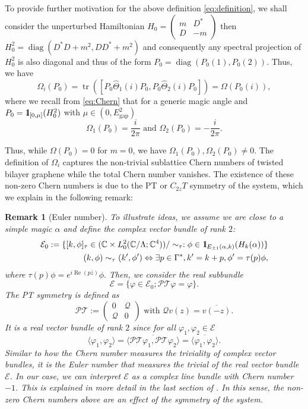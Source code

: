 \documentclass[reqno,12pt,letterpaper]{amsart}
\newcommand{\CC}{{\mathbb C}}
\newtheorem{rem}[theo]{Remark}
\numberwithin{equation}{section}
\DeclareMathOperator{\Real}{Re}
\let\Re=\Real
\DeclareMathOperator{\tr}{tr}
\def\indic{\operatorname{1\hskip-2.75pt\relax l}}
\begin{document}
\begin{appendix}
To provide further motivation for the above definition \eqref{eq:definition}, we shall consider the unperturbed Hamiltonian $H_{0} = \begin{pmatrix} m & D^* \\ D & -m \end{pmatrix}$ then $H_0^2 = \operatorname{diag}(D^*D+m^2 , DD^* + m^2 ) $ and consequently any spectral projection of $H_0^2$ is also diagonal and thus of the form $P_0 = \operatorname{diag}(P_0(1) , P_0(2)).$ Thus, we have 
\[ \Omega_i(P_0) = \tr( [P_0 \hat \Theta_1(i) P_0 , P_0 \hat \Theta_2(i) P_0]) = \Omega(P_0(i)),\]
where we recall from \eqref{eq:Chern} that for a generic magic angle and $P_0 = \indic_{[0,\mu]}(H_0^2)$ with $\mu \in (0,E_{\operatorname{gap}}^2)$
\begin{equation}
\label{eq:P0}
 \Omega_1(P_0) =\frac{i}{2\pi } \text{ and } \Omega_2(P_0)=-\frac{i}{2\pi }.
 \end{equation}

Thus, while $\Omega(P_0)=0$ for $m=0$, we have $\Omega_1(P_0),\Omega_2(P_0) \neq 0.$ The definition of $\Omega_i$ captures the non-trivial sublattice Chern numbers of twisted bilayer graphene while the total Chern number vanishes. The existence of these non-zero Chern numbers is due to the PT or $C_{2z}T$ symmetry of the system, which we explain in the following remark:
\begin{rem}[Euler number]
To illustrate ideas, we assume we are close to a simple magic $\alpha$ and define the complex vector bundle of rank $2$:
\[ \begin{split} \mathcal E_0:= \{ [k,\phi]_{\tau} \in (\CC \times L^2_0(\CC/\Lambda;\CC^4)) / \sim_{\tau}: \phi \in \indic_{E_{\pm 1}(\alpha,k)}(H_k(\alpha)) \} \\
(k,\phi) \sim_{\tau} (k',\phi') \Leftrightarrow \exists p \in \Gamma^* , k'=k+p , \phi' = \tau(p) \phi,
\end{split}\]
where $\tau(p)\phi = e^{i \Re(p \bar z ) } \phi.$
Then, we consider the real subbundle 
\[\mathcal E = \{ \varphi \in \mathcal E_0 ; \mathcal{PT} \varphi= \varphi\}. \]
The PT symmetry is defined as 
\[ \mathcal{PT}:=\begin{pmatrix} 0 & \mathscr Q \\ \mathscr Q & 0 \end{pmatrix} \text{ with } \mathscr Qv(z)=\overline{v(-z)}.\]
It is a real vector bundle of rank $2$ since for all $\varphi_1,\varphi_2 \in \mathcal E$
\[ \langle \varphi_1,\varphi_2 \rangle =\overline{ \langle  \mathcal{PT} \varphi_1, \mathcal{PT} \varphi_2 \rangle} = \overline{\langle \varphi_1,\varphi_2 \rangle}.\]
Similar to how the Chern number measures the triviality of complex vector bundles, it is the Euler number that measures the trivial of the real vector bundle $\mathcal E$. In our case, we can interpret $\mathcal E$ as a complex line bundle with Chern number $-1$. This is explained in more detail in the last section of \cite{FBM}. In this sense, the non-zero Chern numbers above are an effect of the symmetry of the system. 
\end{rem}


\end{appendix}
\end{document}
